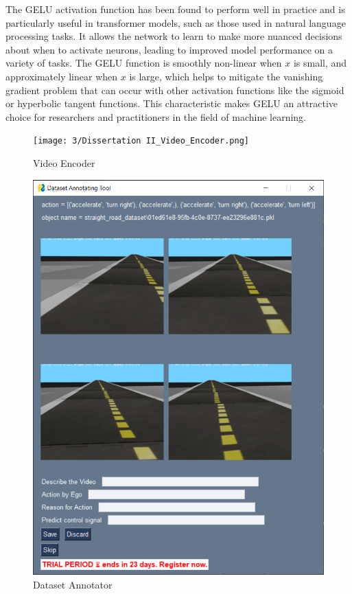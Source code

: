 \begin{spacing}{1.5}
\begin{sloppypar}
The GELU activation function has been found to perform well in practice and is particularly useful in transformer models, such as those used in natural language processing tasks. It allows the network to learn to make more nuanced decisions about when to activate neurons, leading to improved model performance on a variety of tasks. The GELU function is smoothly non-linear when \( x \) is small, and approximately linear when \( x \) is large, which helps to mitigate the vanishing gradient problem that can occur with other activation functions like the sigmoid or hyperbolic tangent functions. This characteristic makes GELU an attractive choice for researchers and practitioners in the field of machine learning.



\begin{figure}[h]
\begin{center}
\texttt{[image: 3/Dissertation II\_Video\_Encoder.png]}
\caption{Video Encoder}
\label{fig:Video Encoder}
\end{center}
\end{figure}

\begin{figure}[h]
\begin{center}
\includegraphics[scale=0.5]{3/Data Annotation.png}
\caption{Dataset Annotator}
\label{fig:Dataset Annotator}
\end{center}
\end{figure}
\end{sloppypar}
 \end{spacing}

 